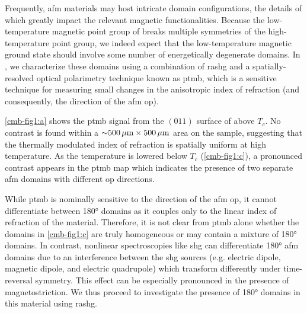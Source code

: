 Frequently, \gls{afm} materials may host intricate domain configurations, the details of which greatly impact the relevant magnetic functionalities\citep{reimers_defect-driven_2022, weber_magnetostrictive_2003}.
Because the low-temperature magnetic point group of \cmb breaks multiple symmetries of the high-temperature point group, we indeed expect that the low-temperature magnetic ground state should involve some number of energetically degenerate domains.
In , we characterize these domains using a combination of \gls{rashg} and a spatially-resolved optical polarimetry technique known as \gls{ptmb}, which is a sensitive technique for measuring small changes in the anisotropic index of refraction (and consequently, the direction of the \gls{afm} \gls{op})\citep{little_three-state_2020, lee_observation_2022}.

\cref{cmb-fig1:a} shows the \gls{ptmb} signal from the $(011)$ surface of \cmb above $T_c$.
No contrast is found within a ${\sim}\qty{500}{\mu m} \times \qty{500}{\mu m}$ area on the sample, suggesting that the thermally modulated index of refraction is spatially uniform at high temperature.
As the temperature is lowered below $T_c$ (\cref{cmb-fig1:c}), a pronounced contrast appears in the \gls{ptmb} map which indicates the presence of two separate \gls{afm} domains with different \gls{op} directions.

While \gls{ptmb} is nominally sensitive to the direction of the \gls{afm} \gls{op}, it cannot differentiate between \ang{180} domains as it couples only to the linear index of refraction of the material.
Therefore, it is not clear from \gls{ptmb} alone whether the domains in \cref{cmb-fig1:c} are truly homogeneous or may contain a mixture of \ang{180} domains.
In contrast, nonlinear spectroscopies like \gls{shg} can differentiate \ang{180} \gls{afm} domains due to an interference between the \gls{shg} sources (e.g. electric dipole, magnetic dipole, and electric quadrupole) which transform differently under time-reversal symmetry\citep{fiebig_second-harmonic_2005, fiebig_second_1994, fiebig_second_2001, fiebig_domain_1995}.
This effect can be especially pronounced in the presence of magnetostriction\citep{fiebig_second_2001}.
We thus proceed to investigate the presence of \ang{180} domains in this material using \gls{rashg}.

